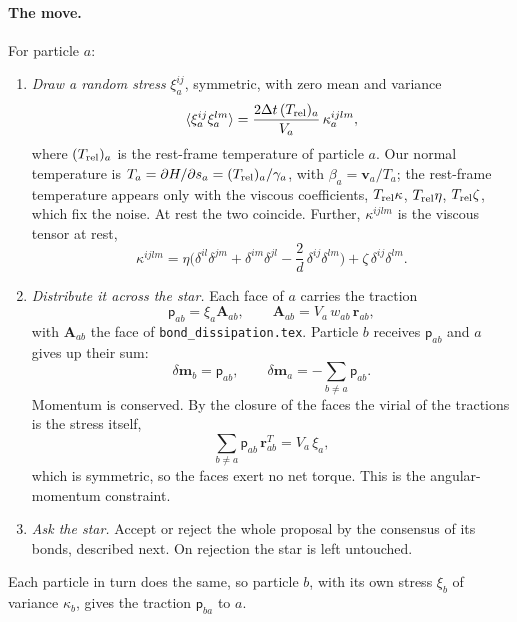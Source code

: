 \documentclass[11pt,aps,preprint,nofootinbib,superscriptaddress,tightenlines]{revtex4-2}
\def\st{\begin{equation}}
\def\stp{\end{equation}}
\newcommand{\pf}{\bm{\mathsf p}}
\newcommand{\avg}[1]{\langle #1\rangle}
\let\oldparagraph\paragraph
\renewcommand{\paragraph}{\par\bigskip\oldparagraph}
\begin{document}
\paragraph{The move.}  For particle $a$:
\begin{enumerate}
\item \emph{Draw a random stress} $\xi_a^{ij}$, symmetric, with zero mean and
  variance
  \st
  \avg{\xi_a^{ij}\xi_a^{lm}}=\frac{2\Delta t\,(T_{\rm rel})_a}{V_a}\,\kappa_a^{ijlm},
  \label{xivar}
  \stp
  where $(T_{\rm rel})_a$ is the rest-frame temperature of particle $a$.  Our
  normal temperature is $T_a=\partial H/\partial s_a=(T_{\rm rel})_a/\gamma_a$, with
  $\beta_a=\bm v_a/T_a$; the rest-frame temperature appears only with the viscous
  coefficients, $T_{\rm rel}\kappa$, $T_{\rm rel}\eta$, $T_{\rm rel}\zeta$, which fix the
  noise.  At rest the two coincide.  Further, $\kappa^{ijlm}$ is the viscous tensor at rest,
  \st
  \kappa^{ijlm}=\eta\Big(\delta^{il}\delta^{jm}+\delta^{im}\delta^{jl}-\frac2d\,\delta^{ij}\delta^{lm}\Big)+\zeta\,\delta^{ij}\delta^{lm}.
  \stp
\item \emph{Distribute it across the star.}  Each face of $a$ carries the
  traction
  \st
  \pf_{ab}=\xi_a\bm A_{ab},\qquad \bm A_{ab}=V_a\,w_{ab}\,\bm r_{ab},
  \label{tstress}
  \stp
  with $\bm A_{ab}$ the face of \texttt{bond\_dissipation.tex}.  Particle $b$
  receives $\pf_{ab}$ and $a$ gives up their sum:
  \st
  \delta\bm m_b=\pf_{ab},\qquad \delta\bm m_a=-\sum_{b\neq a}\pf_{ab}.
  \stp
  Momentum is conserved.  By the closure of the faces the virial of the
  tractions is the stress itself,
  \st
  \sum_{b\neq a}\pf_{ab}\,\bm r_{ab}^T=V_a\,\xi_a ,
  \stp
  which is symmetric, so the faces exert no net torque.  This is the
  angular-momentum constraint.
\item \emph{Ask the star.}  Accept or reject the whole proposal by the
  consensus of its bonds, described next.  On rejection the star is left
  untouched.
\end{enumerate}
Each particle in turn does the same, so particle $b$, with its own stress
$\xi_b$ of variance $\kappa_b$, gives the traction $\pf_{ba}$ to $a$.
\end{document}
